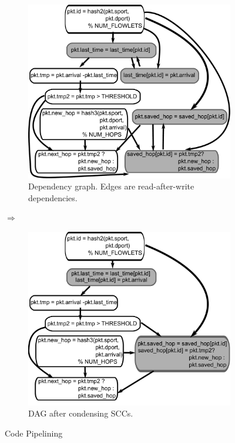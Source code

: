 \begin{figure}[!t]
\begin{subfigure}{\columnwidth}
  \includegraphics[width=\columnwidth]{deps.pdf}
  \caption{Dependency graph. Edges are read-after-write dependencies.}
  \label{fig:partitioning_before}
\end{subfigure}
\textbf{$\Longrightarrow$ }
\begin{subfigure}{\columnwidth}
\includegraphics[width=\columnwidth]{scc.pdf}
\caption{DAG after condensing SCCs.}
\label{fig:partitioning_after}
\end{subfigure}
\caption{Code Pipelining}
\label{fig:pipelining}
\end{figure}

